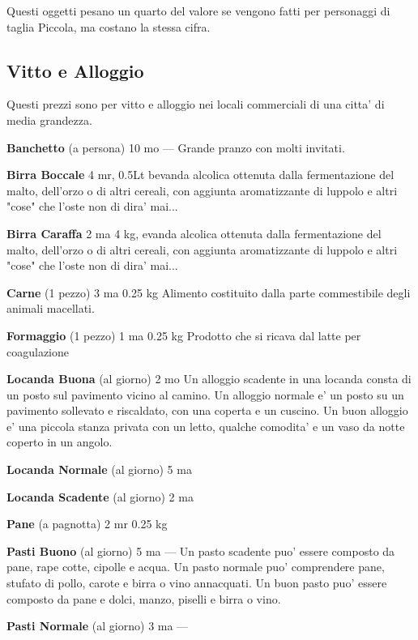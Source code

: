 \documentclass[a4paper,11pt,twoside,openany]{book}
\begin{document}
{Questi oggetti pesano un quarto del valore se vengono fatti per personaggi di taglia Piccola, ma costano la stessa cifra.

\pagebreak

\subsection{Vitto e Alloggio}

\label{vitto-e-alloggio}

Questi prezzi sono per vitto e alloggio nei locali commerciali di una citta' di media grandezza.

\textbf{Banchetto} (a persona) 10 mo --- Grande pranzo con molti invitati.

\textbf{Birra Boccale} 4 mr, 0.5Lt bevanda alcolica ottenuta dalla fermentazione del malto, dell'orzo o di altri cereali, con aggiunta aromatizzante di luppolo e altri "cose" che l'oste non di dira' mai...

\textbf{Birra Caraffa} 2 ma 4 kg, evanda alcolica ottenuta dalla fermentazione del malto, dell'orzo o di altri cereali, con aggiunta aromatizzante di luppolo e altri "cose" che l'oste non di dira' mai...

\textbf{Carne} (1 pezzo) 3 ma 0.25 kg Alimento costituito dalla parte commestibile degli animali macellati.

\textbf{Formaggio} (1 pezzo) 1 ma 0.25 kg Prodotto che si ricava dal latte per coagulazione

\textbf{Locanda Buona} (al giorno) 2 mo Un alloggio scadente in una locanda consta di un posto sul pavimento vicino al camino. Un alloggio normale e' un posto su un pavimento sollevato e riscaldato, con una coperta e un cuscino. Un buon alloggio e' una piccola stanza privata con un letto, qualche comodita' e un vaso da notte coperto in un angolo.

\textbf{Locanda Normale} (al giorno) 5 ma

\textbf{Locanda Scadente} (al giorno) 2 ma 

\textbf{Pane} (a pagnotta) 2 mr 0.25 kg

\textbf{Pasti Buono} (al giorno) 5 ma --- Un pasto scadente puo' essere composto da pane, rape cotte, cipolle e acqua. Un pasto normale puo' comprendere pane, stufato di pollo, carote e birra o vino annacquati. Un buon pasto puo' essere composto da pane e dolci, manzo, piselli e birra o vino.

\textbf{Pasti Normale} (al giorno) 3 ma ---

}
\end{document}
